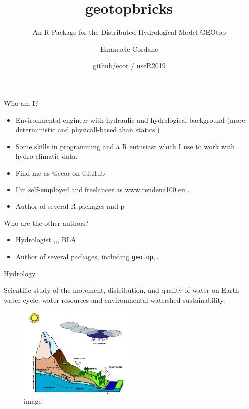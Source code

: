 \documentclass[ignorenonframetext,]{beamer}
\title{geotopbricks}
\subtitle{An R Package for the Distributed Hydrological Model GEOtop}
\author{Emanuele Cordano}
\date{github/ecor / useR2019}
\providecommand{\tightlist}{%
  \setlength{\itemsep}{0pt}\setlength{\parskip}{0pt}}
\begin{document}
\frame{\titlepage}

\begin{frame}{Who am I?}

\begin{itemize}
\tightlist
\item
  Environmental engineer with hydraulic and hydrological background
  (more deterministic and physicall-based than statics!)
\item
  Some skills in programming and a R entusiast which I use to work with
  hydro-climatic data.
\item
  Find me as @ecor on GitHub
\item
  I'm self-employed and freelancer as www.rendena100.eu .\\
\item
  Author of several R-packages and p
\end{itemize}

\end{frame}

\begin{frame}[fragile]{Who are the other authors?}

\begin{itemize}
\tightlist
\item
  Hydrologist ,,, BLA
\item
  Author of several packages, including \texttt{geotop},\ldots{}
\end{itemize}

\end{frame}

\begin{frame}{Hydrology}

Scientific study of the movement, distribution, and quality of water on
Earth water cycle, water resources and environmental watershed
sustainability.

\begin{figure}
\centering
\includegraphics[width=0.50000\textwidth]{resources/images/geotop_landscape.png}
\caption{image}
\end{figure}

\end{frame}
\end{document}
